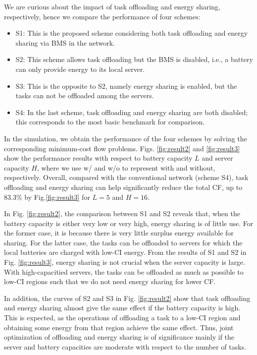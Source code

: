 \documentclass[conference, 10pt, ﬁnal, letterpaper, twocolumn]{IEEEtran}
\begin{document}
We are curious about the impact of task offloading and energy sharing, respectively, hence we compare the performance of four schemes:
\begin{itemize}
    \item S1: This is the proposed scheme considering both task offloading and energy sharing via BMS in the network.
    \item S2: This scheme allows task offloading but the BMS is disabled, i.e., a battery can only provide energy to its local server.
    \item S3: This is the opposite to S2, namely energy sharing is enabled, but the tasks can not be offloaded among the servers.
    \item S4: In the last scheme, task offloading and energy sharing are both disabled; this corresponds to the most basic benchmark for comparison.
\end{itemize}
In the simulation, we obtain the performance of the four schemes by solving the corresponding minimum-cost flow problems. Figs. \ref{fig:result2} and \ref{fig:result3} show the performance results with respect to battery capacity $L$ and server capacity $H$, where we use w/ and w/o to represent with and without, respectively. Overall, compared with the conventional network (scheme S4), task offloading and energy sharing can help significantly reduce the total CF, up to $83.3\%$ by Fig.\ref{fig:result3} for $L = 5$ and $H = 16$.





In Fig. \ref{fig:result2}, the comparison between S1 and S2 reveals that, when the battery capacity is either very low or very high, energy sharing is of little use. For the former case, it is because there is very little surplus energy available for sharing. For the latter case, the tasks can be offloaded to servers for which the local batteries are charged with low-CI energy. From the results of S1 and S2 in Fig. \ref{fig:result3}, energy sharing is not crucial when the server capacity is large. With high-capacitied servers, the tasks can be offloaded as much as possible to low-CI regions such that we do not need energy sharing for lower CF. 

In addition, the curves of S2 and S3 in Fig. \ref{fig:result2} show that task offloading and energy sharing almost give the same effect if the battery capacity is high. This is expected, as the operations of offloading a task to a low-CI region and obtaining some energy from that region achieve the same effect. Thus, joint optimization of offloading and energy sharing is of significance mainly if the server and battery capacities are moderate with respect to the number of tasks.
\end{document}

